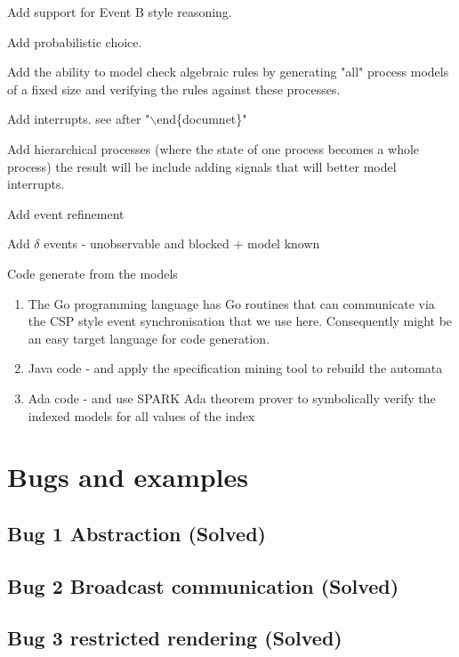 \documentclass[]{article}
\begin{document}
\begin{enumerate}

{\bf 
\item Add support for Event B style reasoning.
\item Add probabilistic choice.

\item Add the ability to model check  algebraic rules by generating "all" process models of a fixed size and verifying the rules against these processes.
\item Add interrupts.  see after "$\backslash$end\{documnet\}"
\item Add hierarchical processes (where the state of one process becomes a whole process)
 the result will be  include adding signals that will  better model interrupts. 
\item Add event refinement
\item Add $\delta$ events - unobservable and blocked + model known 
\item Code generate from the models

\begin{enumerate}
\item The Go programming language has Go routines that can communicate via  the CSP style event synchronisation that we use here. Consequently might be an easy target language for code  generation.
 
\item Java code -  and apply the specification mining tool to rebuild the automata
\item Ada code -  and use SPARK Ada theorem prover to symbolically  verify the indexed models for all values of the index
\end{enumerate}
}
\end{enumerate} 



\newpage
\section{Bugs and examples}
\subsection{Bug 1  Abstraction             (Solved)}
\subsection{Bug 2  Broadcast communication (Solved)}
\subsection{Bug 3 restricted rendering     (Solved)}
\end{document}
